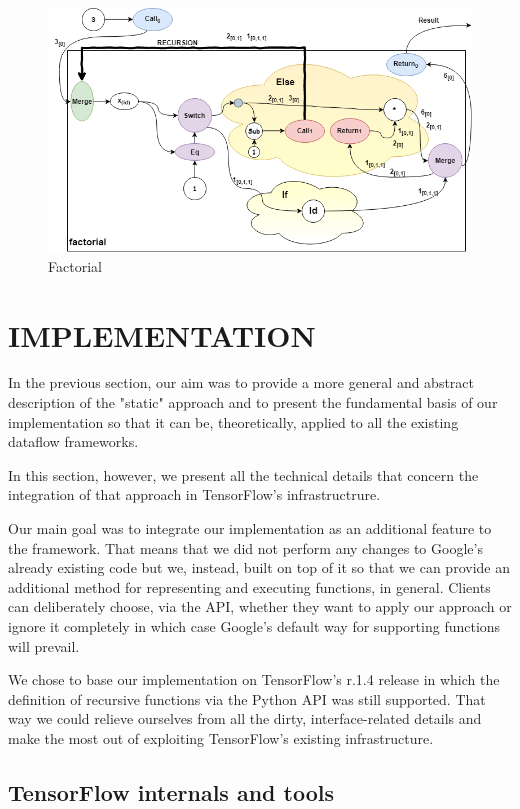 \documentclass[ack,preface]{dithesis}
\begin{document}
\begin{figure}[h]
\centering
\includegraphics[scale=0.63]{figures/factorial}
\caption{Factorial}
\end{figure}
\chapter{IMPLEMENTATION}
In the previous section, our aim was to provide a more general and abstract description of the "static" approach and to present the fundamental basis of our implementation so that it can be, theoretically, applied to all the existing dataflow frameworks. 

In this section, however, we present all the technical details that concern the integration of that approach in TensorFlow's infrastructrure.

Our main goal was to integrate our implementation as an additional feature to the framework. That means that we did not perform any changes to Google's already existing code but we, instead, built on top of it so that we can provide an additional method for representing and executing functions, in general. Clients can deliberately choose, via the API, whether they want to apply our approach or ignore it completely in which case Google's default way for supporting functions will prevail.

We chose to base our implementation on TensorFlow's r.1.4 release in which the definition of recursive functions via the Python API was still supported. That way we could relieve ourselves from all the dirty, interface-related details and make the most out of exploiting TensorFlow's existing infrastructure.  

    \section{TensorFlow internals and tools}
\end{document}
